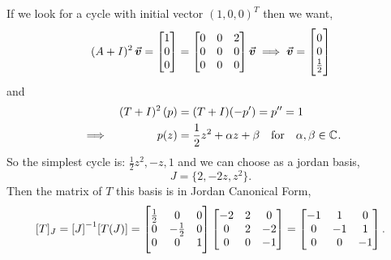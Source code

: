 \documentclass[../MathsNotesBase.tex]{subfiles}
\begin{document}
\begin{exe}
{			If we look for a cycle with initial vector $(1,0,0)^T$ then we want,
			\[ (A + I)^2\,\vec{\bm{v}} = \begin{bmatrix}1\\0\\0\end{bmatrix} = 
				\begin{bmatrix}
					0 & 0 & 2\\
					0 & 0 & 0\\
					0 & 0 & 0
				\end{bmatrix}\vec{\bm{v}} \implies
				\vec{\bm{v}} = \begin{bmatrix}0\\0\\\frac{1}{2}\end{bmatrix}
			\]
			and
			\[\begin{aligned}
				&& (T + I)^2\,(p) &= (T + I)(-p') = p'' = 1 \\
				&\implies & p(z) &= \frac{1}{2}z^2 + \alpha z + \beta \hspace{10pt}\text{for}\hspace{10pt} \alpha,\beta \in \mathbb{C}^{}.
			\end{aligned}\]
			So the simplest cycle is: ${ \frac{1}{2}z^2, -z, 1 }$ and we can choose as a jordan basis,
			\[ J = \{ 2, -2z, z^2 \}. \]
			Then the matrix of $T$ \wrt this basis is in Jordan Canonical Form,
			\[ [T]_J = {[J]}^{-1}[T(J)] = 	
				\begin{bmatrix}
					\frac{1}{2} & 0 & 0\\
					0 & -\frac{1}{2} & 0\\
					0 & 0 & 1
				\end{bmatrix}
				\begin{bmatrix}
					-2 & 2 & 0\\
					0 & 2 & -2\\
					0 & 0 & -1
				\end{bmatrix} =
				\begin{bmatrix}
					-1 & 1 & 0\\
					0 & -1 & 1\\
					0 & 0 & -1
				\end{bmatrix}.
			\]
		}
	\end{exe}





\pagebreak
\end{document}

